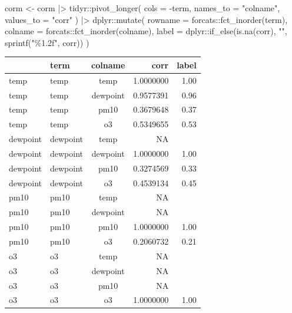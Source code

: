 \documentclass[
  letterpaper,
]{scrbook}
\newenvironment{Shaded}{\begin{snugshade}}{\end{snugshade}}
\newcommand{\AttributeTok}[1]{\textcolor[rgb]{0.40,0.45,0.13}{#1}}
\newcommand{\FunctionTok}[1]{\textcolor[rgb]{0.28,0.35,0.67}{#1}}
\newcommand{\NormalTok}[1]{\textcolor[rgb]{0.00,0.23,0.31}{#1}}
\newcommand{\OtherTok}[1]{\textcolor[rgb]{0.00,0.23,0.31}{#1}}
\newcommand{\SpecialCharTok}[1]{\textcolor[rgb]{0.37,0.37,0.37}{#1}}
\newcommand{\StringTok}[1]{\textcolor[rgb]{0.13,0.47,0.30}{#1}}
\begin{document}
\begin{Shaded}
\begin{Highlighting}[]
\NormalTok{corm }\OtherTok{\textless{}{-}}\NormalTok{ corm }\SpecialCharTok{|\textgreater{}}
\NormalTok{  tidyr}\SpecialCharTok{::}\FunctionTok{pivot\_longer}\NormalTok{(}
    \AttributeTok{cols =} \SpecialCharTok{{-}}\NormalTok{term,}
    \AttributeTok{names\_to =} \StringTok{"colname"}\NormalTok{,}
    \AttributeTok{values\_to =} \StringTok{"corr"}
\NormalTok{  ) }\SpecialCharTok{|\textgreater{}}
\NormalTok{  dplyr}\SpecialCharTok{::}\FunctionTok{mutate}\NormalTok{(}
    \AttributeTok{rowname =}\NormalTok{ forcats}\SpecialCharTok{::}\FunctionTok{fct\_inorder}\NormalTok{(term),}
    \AttributeTok{colname =}\NormalTok{ forcats}\SpecialCharTok{::}\FunctionTok{fct\_inorder}\NormalTok{(colname),}
    \AttributeTok{label =}\NormalTok{ dplyr}\SpecialCharTok{::}\FunctionTok{if\_else}\NormalTok{(}\FunctionTok{is.na}\NormalTok{(corr), }\StringTok{""}\NormalTok{, }\FunctionTok{sprintf}\NormalTok{(}\StringTok{"\%1.2f"}\NormalTok{, corr))}
\NormalTok{  )}
\end{Highlighting}
\end{Shaded}

\begin{longtable*}{l|lcrr}
\toprule
{} & term & colname & corr & label \\ 
\midrule\addlinespace[2.5pt]
temp & temp & temp & 1.0000000 & 1.00 \\ 
temp & temp & dewpoint & 0.9577391 & 0.96 \\ 
temp & temp & pm10 & 0.3679648 & 0.37 \\ 
temp & temp & o3 & 0.5349655 & 0.53 \\ 
dewpoint & dewpoint & temp & NA &  \\ 
dewpoint & dewpoint & dewpoint & 1.0000000 & 1.00 \\ 
dewpoint & dewpoint & pm10 & 0.3274569 & 0.33 \\ 
dewpoint & dewpoint & o3 & 0.4539134 & 0.45 \\ 
pm10 & pm10 & temp & NA &  \\ 
pm10 & pm10 & dewpoint & NA &  \\ 
pm10 & pm10 & pm10 & 1.0000000 & 1.00 \\ 
pm10 & pm10 & o3 & 0.2060732 & 0.21 \\ 
o3 & o3 & temp & NA &  \\ 
o3 & o3 & dewpoint & NA &  \\ 
o3 & o3 & pm10 & NA &  \\ 
o3 & o3 & o3 & 1.0000000 & 1.00 \\ 
\bottomrule
\end{longtable*}
\end{document}
